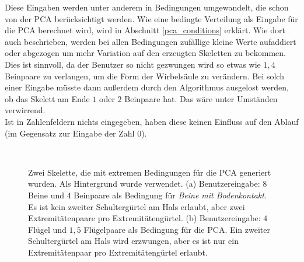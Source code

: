 Diese Eingaben werden unter anderem in Bedingungen umgewandelt, die schon von der PCA berücksichtigt werden. Wie eine bedingte Verteilung als Eingabe für die PCA berechnet wird, wird in Abschnitt \ref{pca_conditions} erklärt. Wie dort auch beschrieben, werden bei allen Bedingungen zufällige kleine Werte aufaddiert oder abgezogen um mehr Variation auf den erzeugten Skeletten zu bekommen. Dies ist sinnvoll, da der Benutzer so nicht gezwungen wird so etwas wie $1{,}4$ Beinpaare zu verlangen, um \zb die Form der Wirbelsäule zu verändern. Bei solch einer Eingabe müsste dann außerdem durch den Algorithmus ausgelost werden, ob das Skelett am Ende $1$ oder $2$ Beinpaare hat. Das wäre unter Umständen verwirrend.\\
Ist in Zahlenfeldern nichts eingegeben, haben diese keinen Einfluss auf den Ablauf (im Gegensatz zur Eingabe der Zahl $0$).

\begin{figure}
 ~
 
 \caption{Zwei Skelette, die mit extremen Bedingungen für die PCA generiert wurden. Als Hintergrund wurde \cite{background} verwendet. (a) Benutzereingabe: $8$ Beine und $4$ Beinpaare als Bedingung für \emph{Beine mit Bodenkontakt}. Es ist kein zweiter Schultergürtel am Hals erlaubt, aber zwei Extremitätenpaare pro Extremitätengürtel. (b) Benutzereingabe: $4$ Flügel und $1{,}5$ Flügelpaare als Bedingung für die PCA. Ein zweiter Schultergürtel am Hals wird erzwungen, aber es ist nur ein Extremitätenpaar pro Extremitätengürtel erlaubt.}
 \label{more_extremities}
\end{figure}

